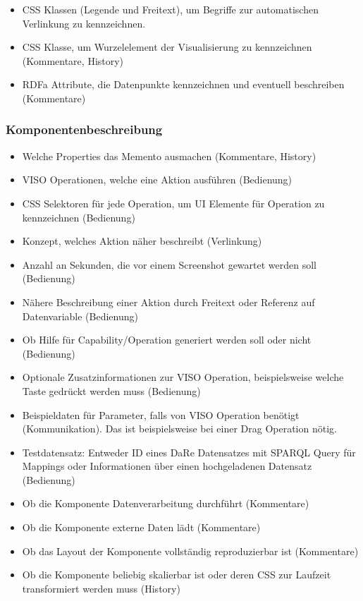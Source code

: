 \documentclass[
	headsepline,
	footsepline,
	fontsize=12pt,
	bibliography=totoc
]{scrbook}
\begin{document}
\begin{itemize}
	\item CSS Klassen (Legende und Freitext), um Begriffe zur automatischen Verlinkung zu kennzeichnen.
	\item CSS Klasse, um Wurzelelement der Visualisierung zu kennzeichnen (Kommentare, History)
	\item RDFa Attribute, die Datenpunkte kennzeichnen und eventuell beschreiben (Kommentare)
\end{itemize}

\subsubsection{Komponentenbeschreibung}

\begin{itemize}
	\item Welche Properties das Memento ausmachen (Kommentare, History)
	\item VISO Operationen, welche eine Aktion ausführen (Bedienung)
	\item CSS Selektoren für jede Operation, um UI Elemente für Operation zu kennzeichnen (Bedienung)
	\item Konzept, welches Aktion näher beschreibt (Verlinkung)
	\item Anzahl an Sekunden, die vor einem Screenshot gewartet werden soll (Bedienung)
	\item Nähere Beschreibung einer Aktion durch Freitext oder Referenz auf Datenvariable (Bedienung)
	\item Ob Hilfe für Capability/Operation generiert werden soll oder nicht (Bedienung)
	\item Optionale Zusatzinformationen zur VISO Operation, beispielsweise welche Taste gedrückt werden muss (Bedienung)
	\item Beispieldaten für Parameter, falls von VISO Operation benötigt (Kommunikation). Das ist beispielsweise bei einer Drag Operation nötig.
	\item Testdatensatz: Entweder ID eines DaRe Datensatzes mit SPARQL Query für Mappings oder Informationen über einen hochgeladenen Datensatz (Bedienung)
	\item Ob die Komponente Datenverarbeitung durchführt (Kommentare)
	\item Ob die Komponente externe Daten lädt (Kommentare)
	\item Ob das Layout der Komponente vollständig reproduzierbar ist (Kommentare)
	\item Ob die Komponente beliebig skalierbar ist oder deren CSS zur Laufzeit transformiert werden muss (History)
\end{itemize}
\end{document}
